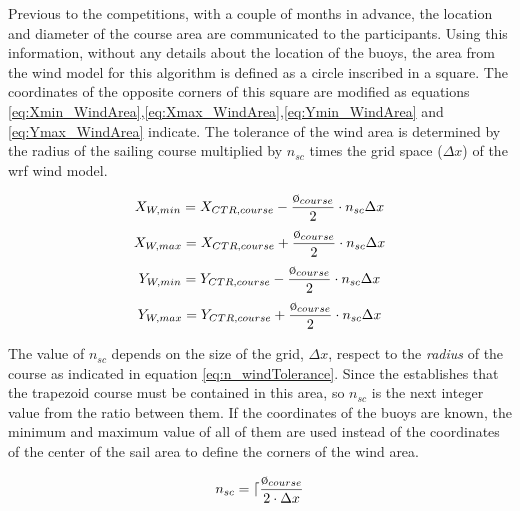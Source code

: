 Previous to the competitions, with a couple of months in advance, the location and diameter of the course area are communicated to the participants. Using this information, without any details about the location of the buoys, the area from the wind model for this algorithm is defined as a circle inscribed in a square. The coordinates of the opposite corners of this square are modified as equations \ref{eq:Xmin_WindArea},\ref{eq:Xmax_WindArea},\ref{eq:Ymin_WindArea} and \ref{eq:Ymax_WindArea} indicate. The tolerance of the wind area is determined by the radius of the sailing course multiplied by \textit{$n_{sc}$} times the grid space  ($\Delta x$) of the \acrshort{wrf} wind model. \par
\begin{equation} \label{eq:Xmin_WindArea}
    X_{W,min}= X_{CTR,course}-\frac{\clock_{course}}{2} \cdot n_{sc}   \Delta x
\end{equation}
\begin{equation} \label{eq:Xmax_WindArea}
    X_{W,max}= X_{CTR,course} + \frac{\clock_{course}}{2} \cdot n_{sc}  \Delta x
\end{equation}
\begin{equation} \label{eq:Ymin_WindArea}
    Y_{W,min}= Y_{CTR,course}-\frac{\clock_{course}}{2} \cdot n_{sc}    \Delta x
\end{equation}
\begin{equation} \label{eq:Ymax_WindArea}
    Y_{W,max}= Y_{CTR,course} + \frac{\clock_{course}}{2} \cdot  n_{sc}  \Delta x
\end{equation}
\par
The value of \textit{$n_{sc}$} depends on the size of the grid, $\Delta x $, respect to the \textit{radius} of the course as indicated in equation \ref{eq:n_windTolerance}. Since the  \cite{race_pol2017} establishes that the trapezoid course must be contained in this area, so \textit{$n_{sc}$} is the next integer value from the ratio between them. If the coordinates of the buoys are known, the minimum and maximum value of all of them are used instead of the coordinates of the center of the sail area to define the corners of the wind area. \par %
\begin{equation} \label{eq:n_windTolerance}
    n_{sc}=\lceil \frac{\clock_{course}}{2 \cdot \Delta x}
\end{equation}
